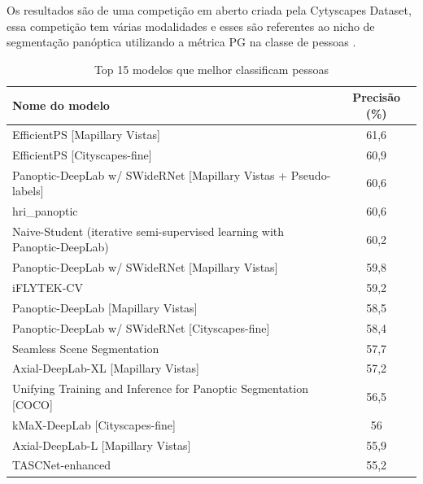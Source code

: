 Os resultados são de uma competição em aberto criada pela Cytyscapes Dataset, essa competição tem várias modalidades e esses são referentes ao nicho de segmentação panóptica utilizando a métrica PG na classe de pessoas \cite{datasetResults}.
\begin{table}[H]
	\centering
	\caption{Top 15 modelos que melhor classificam pessoas}
	\label{tab:resultados-cityscapes}
	\begin{tabular}{|l|c|}
	  \hline
	  Nome do modelo & Precisão (\%) \\
	  \hline
	  EfficientPS [Mapillary Vistas] & 61,6 \\
	  EfficientPS [Cityscapes-fine] & 60,9 \\
	  Panoptic-DeepLab w/ SWideRNet [Mapillary Vistas + Pseudo-labels] & 60,6 \\
	  hri\_panoptic & 60,6 \\
	  Naive-Student (iterative semi-supervised learning with Panoptic-DeepLab) & 60,2 \\
	  Panoptic-DeepLab w/ SWideRNet [Mapillary Vistas] & 59,8 \\
	  iFLYTEK-CV & 59,2 \\
	  Panoptic-DeepLab [Mapillary Vistas] & 58,5 \\
	  Panoptic-DeepLab w/ SWideRNet [Cityscapes-fine] & 58,4 \\
	  Seamless Scene Segmentation & 57,7 \\
	  Axial-DeepLab-XL [Mapillary Vistas] & 57,2 \\
	  Unifying Training and Inference for Panoptic Segmentation [COCO] & 56,5 \\
	  kMaX-DeepLab [Cityscapes-fine] & 56 \\
	  Axial-DeepLab-L [Mapillary Vistas] & 55,9 \\
	  TASCNet-enhanced & 55,2 \\
	  \hline
	\end{tabular}
  \end{table}
  
  

